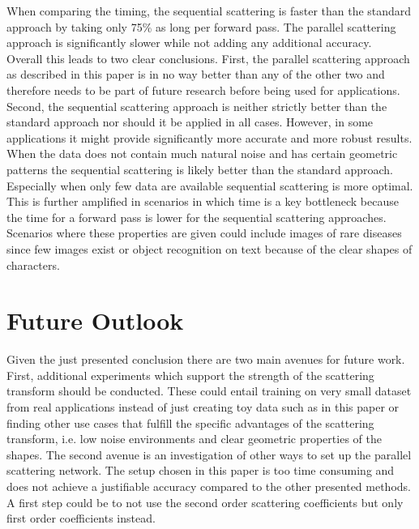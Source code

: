 When comparing the timing, the sequential scattering is faster than the standard approach by taking only 75\% as long per forward pass. The parallel scattering approach is significantly slower while not adding any additional accuracy.\\
Overall this leads to two clear conclusions. First, the parallel scattering approach as described in this paper is in no way better than any of the other two and therefore needs to be part of future research before being used for applications. Second, the sequential scattering approach is neither strictly better than the standard approach nor should it be applied in all cases. However, in some applications it might provide significantly more accurate and more robust results. When the data does not contain much natural noise and has certain geometric patterns the sequential scattering is likely better than the standard approach. Especially when only few data are available sequential scattering is more optimal. This is further amplified in scenarios in which time is a key bottleneck because the time for a forward pass is lower for the sequential scattering approaches. Scenarios where these properties are given could include images of rare diseases since few images exist or object recognition on text because of the clear shapes of characters. 

\section{Future Outlook}

Given the just presented conclusion there are two main avenues for future work. First, additional experiments which support the strength of the scattering transform should be conducted. These could entail training on very small dataset from real applications instead of just creating toy data such as in this paper or finding other use cases that fulfill the specific advantages of the scattering transform, i.e. low noise environments and clear geometric properties of the shapes. The second avenue is an investigation of other ways to set up the parallel scattering network. The setup chosen in this paper is too time consuming and does not achieve a justifiable accuracy compared to the other presented methods. A first step could be to not use the second order scattering coefficients but only first order coefficients instead. 